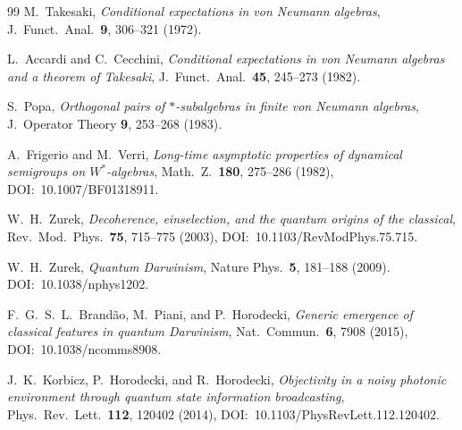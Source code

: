 \documentclass[12pt]{article}
\theoremstyle{definition}
\theoremstyle{remark}
\begin{document}
\begin{thebibliography}{99}
M.~Takesaki,
\emph{Conditional expectations in von Neumann algebras},
J.\ Funct.\ Anal.\ \textbf{9}, 306--321 (1972).

L.~Accardi and C.~Cecchini,
\emph{Conditional expectations in von Neumann algebras and a theorem of
Takesaki},
J.\ Funct.\ Anal.\ \textbf{45}, 245--273 (1982).

S.~Popa,
\emph{Orthogonal pairs of \(*\)-subalgebras in finite von Neumann
algebras},
J.\ Operator Theory \textbf{9}, 253--268 (1983).

A.~Frigerio and M.~Verri,
\emph{Long-time asymptotic properties of dynamical semigroups on \(W^*\)-algebras},
Math.\ Z.\ \textbf{180}, 275--286 (1982), DOI:~10.1007/BF01318911.

W.~H.~Zurek,
\emph{Decoherence, einselection, and the quantum origins of the classical},
Rev.\ Mod.\ Phys.\ \textbf{75}, 715--775 (2003), DOI:~10.1103/RevModPhys.75.715.

W.~H.~Zurek,
\emph{Quantum Darwinism},
Nature Phys.\ \textbf{5}, 181--188 (2009). DOI:~10.1038/nphys1202.

F.~G.~S.~L.~Brand\~ao, M.~Piani, and P.~Horodecki,
\emph{Generic emergence of classical features in quantum Darwinism},
Nat.\ Commun.\ \textbf{6}, 7908 (2015), DOI:~10.1038/ncomms8908.

J.~K.~Korbicz, P.~Horodecki, and R.~Horodecki,
\emph{Objectivity in a noisy photonic environment through quantum state information broadcasting},
Phys.\ Rev.\ Lett.\ \textbf{112}, 120402 (2014), DOI:~10.1103/PhysRevLett.112.120402.

\end{thebibliography}
 
\end{document}
